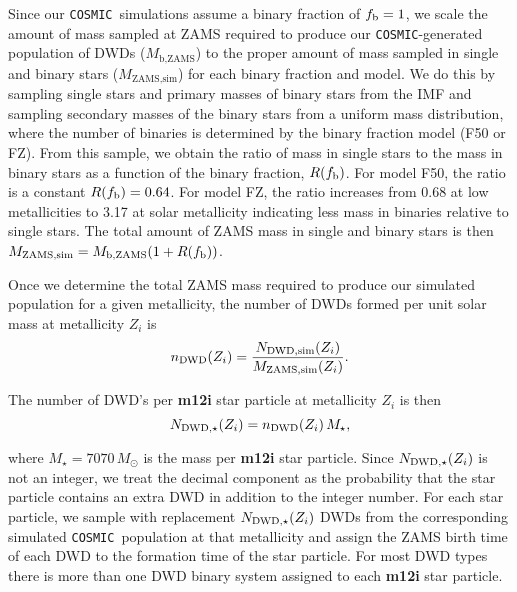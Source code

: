 \documentclass[twocolumn, linenumbers]{aastex631}
\newcommand{\cosmic}{\texttt{COSMIC}}
\begin{document}
Since our \cosmic\ simulations assume a binary fraction of $f_{\rm{b}} = 1$, we scale the amount of mass sampled at ZAMS required to produce our \cosmic-generated population of DWDs ($M_{\text{b,ZAMS}}$) to the proper amount of mass sampled in single and binary stars ($M_{\text{ZAMS,sim}}$) for each binary fraction and model. We do this by sampling single stars and primary masses of binary stars from the \cite{Kroupa2001} IMF and sampling secondary masses of the binary stars from a uniform mass distribution, where the number of binaries is determined by the binary fraction model (F50 or FZ). From this sample, we obtain the ratio of mass in single stars to the mass in binary stars as a function of the binary fraction, $R(f_{\rm{b}})$. For model F50, the ratio is a constant $R(f_{\rm{b}}) = 0.64$. For model FZ, the ratio increases from 0.68 at low metallicities to 3.17 at solar metallicity indicating less mass in binaries relative to single stars. The total amount of ZAMS mass in single and binary stars is then $M_{\text{ZAMS,sim}} =  M_{\text{b,ZAMS}} (1 + R(f_{\rm{b}}))$. 


Once we determine the total ZAMS mass required to produce our simulated population for a given metallicity, the number of DWDs formed per unit solar mass at metallicity $Z_i$ is
\begin{equation}
    n_{\rm{DWD}}(Z_i) = \frac{N_{\rm{DWD, sim}}(Z_i)}{M_{\rm{ZAMS, sim}}(Z_i)}.
\end{equation}

\noindent The number of DWD’s per \textbf{m12i} star particle at metallicity $Z_i$ is then
\begin{equation}
    N_{\rm{DWD},\star} (Z_i) = n_{\rm{DWD}}(Z_i)\, M_\star,
\end{equation}


\noindent where $M_\star = 7070\,M_\odot$ is the mass per \textbf{m12i} star particle. Since $N_{\rm{DWD},\star} (Z_i)$ is not an integer, we treat the decimal component as the probability that the star particle contains an extra DWD in addition to the integer number. For each star particle, we sample with replacement $N_{\rm{DWD},\star}(Z_i)$ DWDs from the corresponding simulated \cosmic\ population at that metallicity and assign the ZAMS birth time of each DWD to the formation time of the star particle. For most DWD types there is more than one DWD binary system assigned to each \textbf{m12i} star particle. 
\end{document}
